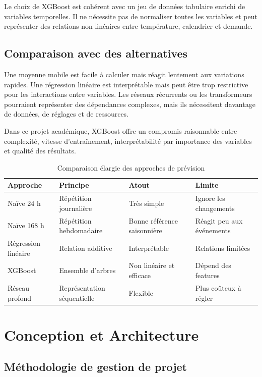 \documentclass[12pt,a4paper]{report}
\begin{document}
Le choix de XGBoost est cohérent avec un jeu de données tabulaire enrichi de
variables temporelles. Il ne nécessite pas de normaliser toutes les variables
et peut représenter des relations non linéaires entre température, calendrier
et demande.

\section{Comparaison avec des alternatives}

Une moyenne mobile est facile à calculer mais réagit lentement aux variations
rapides. Une régression linéaire est interprétable mais peut être trop
restrictive pour les interactions entre variables. Les réseaux récurrents ou
les transformeurs pourraient représenter des dépendances complexes, mais ils
nécessitent davantage de données, de réglages et de ressources.

Dans ce projet académique, XGBoost offre un compromis raisonnable entre
complexité, vitesse d'entraînement, interprétabilité par importance des
variables et qualité des résultats.

\begin{table}[htbp]
\centering
\caption{Comparaison élargie des approches de prévision}
\label{tab:approches-prevision}
\begin{tabular}{p{} p{} p{} p{}}
\toprule
Approche & Principe & Atout & Limite \\
\midrule
Naïve 24 h & Répétition journalière & Très simple & Ignore les changements \\
Naïve 168 h & Répétition hebdomadaire & Bonne référence saisonnière & Réagit peu aux événements \\
Régression linéaire & Relation additive & Interprétable & Relations limitées \\
XGBoost & Ensemble d'arbres & Non linéaire et efficace & Dépend des features \\
Réseau profond & Représentation séquentielle & Flexible & Plus coûteux à régler \\
\bottomrule
\end{tabular}
\end{table}

\chapter{Conception et Architecture}

\section{Méthodologie de gestion de projet}
\end{document}
